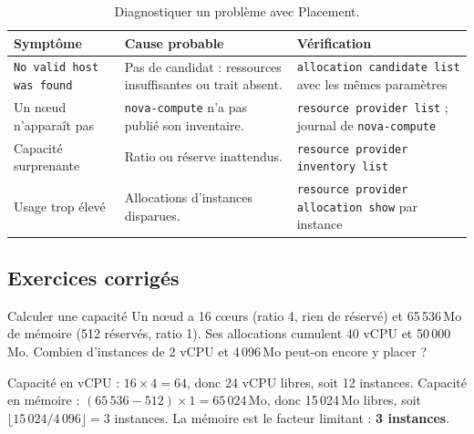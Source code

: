 \begin{table}[!ht]
\centering
\renewcommand{\arraystretch}{1.3}
\begin{tabular}{@{}>{\raggedright\arraybackslash}p{4.6cm}>{\raggedright\arraybackslash}p{5.6cm}>{\raggedright\arraybackslash}p{5.3cm}@{}}
\toprule
\textbf{Symptôme} & \textbf{Cause probable} & \textbf{Vérification} \\
\midrule
\texttt{No valid host was found} & Pas de candidat : ressources insuffisantes ou trait absent. & \texttt{allocation candidate list} avec les mêmes paramètres \\
Un nœud n'apparaît pas & \texttt{nova-compute} n'a pas publié son inventaire. & \texttt{resource provider list} ; journal de \texttt{nova-compute} \\
Capacité surprenante & Ratio ou réserve inattendus. & \texttt{resource provider inventory list} \\
Usage trop élevé & Allocations d'instances disparues. & \texttt{resource provider allocation show} par instance \\
\bottomrule
\end{tabular}
\caption{Diagnostiquer un problème avec Placement.}
\label{tab:pl-pannes}
\end{table}

\subsection{Exercices corrigés}\label{sec:pl-exercices}

\begin{exercice}{Calculer une capacité}\label{ex:pl-capacite}
Un nœud a 16 cœurs (ratio 4, rien de réservé) et 65\,536\,Mo de mémoire (512 réservés, ratio 1). Ses allocations
cumulent 40 vCPU et 50\,000\,Mo. Combien d'instances de 2 vCPU et 4\,096\,Mo peut-on encore y placer ?
\end{exercice}
\begin{correction}
Capacité en vCPU : $16\times4=64$, donc 24 vCPU libres, soit 12 instances. Capacité en mémoire :
$(65\,536-512)\times1=65\,024$\,Mo, donc 15\,024\,Mo libres, soit $\lfloor15\,024/4\,096\rfloor=3$ instances. La
mémoire est le facteur limitant : \textbf{3 instances}.
\end{correction}

